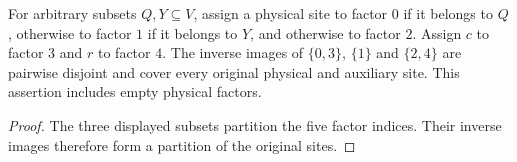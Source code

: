 \begin{theorem}
\label{thm:regional_replica_metric_partition}
\leanok
For arbitrary subsets $Q,Y\subseteq V$, assign a physical site to
factor $0$ if it belongs to $Q$, otherwise to factor $1$ if it belongs
to $Y$, and otherwise to factor $2$. Assign $c$ to factor $3$ and
$r$ to factor $4$. The inverse images of $\{0,3\}$, $\{1\}$ and
$\{2,4\}$ are pairwise disjoint and cover every original physical
and auxiliary site. This assertion includes empty physical factors.
\end{theorem}
\begin{proof}
\leanok
{}
The three displayed subsets partition the five factor indices.
Their inverse images therefore form a partition of the original sites.
\end{proof}
